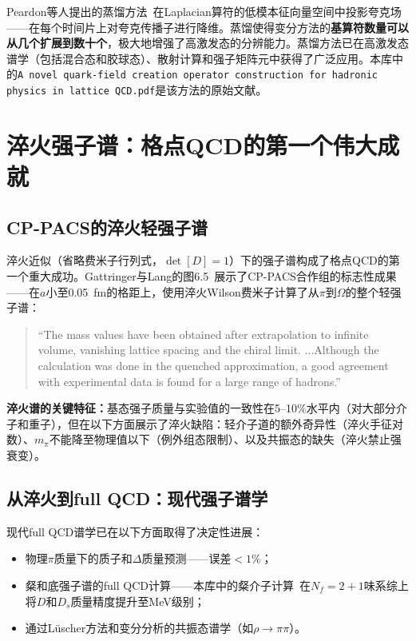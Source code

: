 \documentclass[12pt,a4paper]{ctexart}
\theoremstyle{definition}
\begin{document}
Peardon等人提出的蒸馏方法~\cite{Distillation2009}在Laplacian算符的低模本征向量空间中投影夸克场——在每个时间片上对夸克传播子进行降维。蒸馏使得变分方法的\textbf{基算符数量可以从几个扩展到数十个}，极大地增强了高激发态的分辨能力。蒸馏方法已在高激发态谱学（包括混合态和胶球态）、散射计算和强子矩阵元中获得了广泛应用。本库中的\texttt{A novel quark-field creation operator construction for hadronic physics in lattice QCD.pdf}是该方法的原始文献。

\section{淬火强子谱：格点QCD的第一个伟大成就}

\subsection{CP-PACS的淬火轻强子谱}

淬火近似（省略费米子行列式，$\det[D]=1$）下的强子谱构成了格点QCD的第一个重大成功。Gattringer与Lang的图6.5~\cite{GattringerLang2010}展示了CP-PACS合作组的标志性成果——在$a$小至0.05~fm的格距上，使用淬火Wilson费米子计算了从$\pi$到$\Omega$的整个轻强子谱：

\begin{quote}
``The mass values have been obtained after extrapolation to infinite volume, vanishing lattice spacing and the chiral limit. ...Although the calculation was done in the quenched approximation, a good agreement with experimental data is found for a large range of hadrons.''~\cite{GattringerLang2010}
\end{quote}

\textbf{淬火谱的关键特征：}基态强子质量与实验值的一致性在5--10\%水平内（对大部分介子和重子），但在以下方面展示了淬火缺陷：轻介子道的额外奇异性（淬火手征对数）、$m_\pi$不能降至物理值以下（例外组态限制）、以及共振态的缺失（淬火禁止强衰变）。

\subsection{从淬火到full QCD：现代强子谱学}

现代full QCD谱学已在以下方面取得了决定性进展：
\begin{itemize}[nosep]
    \item 物理$\pi$质量下的质子和$\Delta$质量预测——误差$<1\%$；
    \item 粲和底强子谱的full QCD计算——本库中的粲介子计算~\cite{CharmedClover}在$N_f=2+1$味系综上将$D$和$D_s$质量精度提升至MeV级别；
    \item 通过L\"uscher方法和变分分析的共振态谱学（如$\rho\to\pi\pi$）。
\end{itemize}
\end{document}
